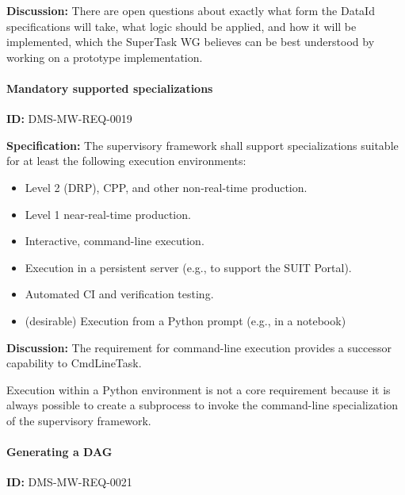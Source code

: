 \documentclass[SE,toc,lsstdraft]{lsstdoc}
\begin{document}
\textbf{Discussion:}
There are open questions about exactly what form the DataId specifications will take, what logic should be applied, and how it will be implemented, which the SuperTask WG believes can be best understood by working on a prototype implementation.

\paragraph{Mandatory supported specializations}\hfill  %

\label{DMS-MW-REQ-0019}
\textbf{ID:} DMS-MW-REQ-0019

\textbf{Specification:}
The supervisory framework shall support specializations suitable for at least the following execution environments:

    \begin{itemize}
\item
Level 2 (DRP), CPP, and other non-real-time production.

\item
Level 1 near-real-time production.

\item
Interactive, command-line execution.

\item
Execution in a persistent server (e.g., to support the SUIT Portal).

\item
Automated CI and verification testing.

\item
(desirable) Execution from a Python prompt (e.g., in a notebook)

    \end{itemize}

\textbf{Discussion:}
The requirement for command-line execution provides a successor capability to CmdLineTask.

Execution within a Python environment is not a core requirement because it is always possible to create a subprocess to invoke the command-line specialization of the supervisory framework.

\paragraph{Generating a DAG}\hfill  %

\label{DMS-MW-REQ-0021}
\textbf{ID:} DMS-MW-REQ-0021
\end{document}
